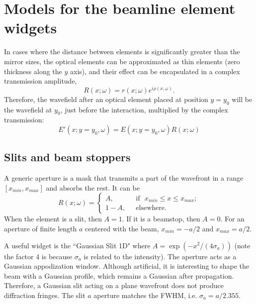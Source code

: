 \documentclass{iopconfser}
\begin{document}
\section{Models for the beamline element widgets}
\label{sec:elements}

In cases where the distance between elements is significantly greater than the mirror sizes, the optical elements can be approximated as thin elements (zero thickness along the $y$ axis), and their effect can be encapsulated in a complex transmission amplitude,
\begin{equation}
    \label{eq:thinelement}
    R(x;\omega)=r(x;\omega) e^{i \rho(x,\omega)}.
\end{equation}
Therefore, the wavefield after an optical element placed at position $y=y_0$ will be the wavefield at $y_0$, just before the interaction, multiplied by the complex transmission:
\begin{equation}
    E'(x;y=y_0,\omega) = E(x;y=y_0,\omega) R(x;\omega)
\end{equation}

\subsection{Slits and beam stoppers}

A generic aperture is a mask that transmits a part of the wavefront in a range $[x_{min},x_{max}]$ and absorbs the rest. It can be
\begin{equation}
R(x;\omega) =
\left\{
\begin{matrix}
A,  & \mbox{~~if~~} x_{min} \le x \le x_{max};
\\ 
1 - A, & \mbox{~~elsewhere}.
\end{matrix}
\right.
\end{equation}
When the element is a slit, then $A=1$. If it is a beamstop, then $A=0$. For an aperture of finite length $a$ centered with the beam, $x_{min}=-a/2$ and $x_{max}=a/2$.

A useful widget is the ``Gaussian Slit 1D" where $A=\exp(-x^2/(4\sigma_a))$ (note the factor 4 is because $\sigma_a$ is related to the intensity). The aperture acts as a Gaussian appodization window. Although artificial, it is interesting to shape the beam with a Gaussian profile, which remains a Gaussian after propagation. Therefore, a Gaussian slit acting on a plane wavefront does not produce diffraction fringes. 
The slit $a$ aperture matches the FWHM, i.e. $\sigma_a=a/2.355$.
\end{document}

